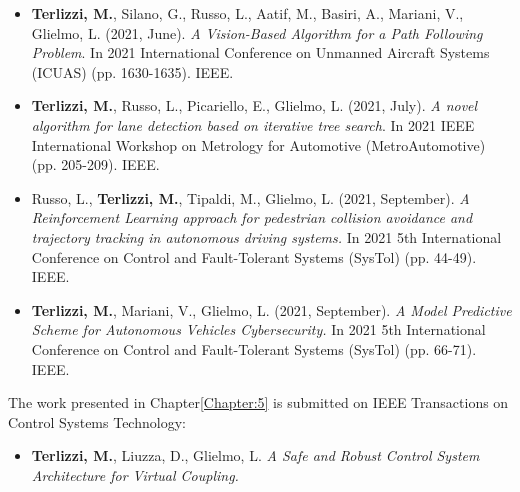 \begin{itemize}
	\item \cite{terlizzi2021vision} \textbf{Terlizzi, M.}, Silano, G., Russo, L., Aatif, M., Basiri, A., Mariani, V.,  Glielmo, L. (2021, June). \textit{A Vision-Based Algorithm for a Path Following Problem}. In 2021 International Conference on Unmanned Aircraft Systems (ICUAS) (pp. 1630-1635). IEEE.
	\item \cite{terlizzi2021novel} \textbf{Terlizzi, M.}, Russo, L., Picariello, E.,  Glielmo, L. (2021, July).\textit{ A novel algorithm for lane detection based on iterative tree search}. In 2021 IEEE International Workshop on Metrology for Automotive (MetroAutomotive) (pp. 205-209). IEEE.
	\item \cite{russo2021reinforcement} Russo, L., \textbf{Terlizzi, M.}, Tipaldi, M.,  Glielmo, L. (2021, September). \textit{A Reinforcement Learning approach for pedestrian collision avoidance and trajectory tracking in autonomous driving systems.} In 2021 5th International Conference on Control and Fault-Tolerant Systems (SysTol) (pp. 44-49). IEEE.
	\item \cite{terlizzi2021CyberSecurity} \textbf{Terlizzi, M.}, Mariani, V.,  Glielmo, L. (2021, September). \textit{A Model Predictive Scheme for Autonomous Vehicles Cybersecurity.} In 2021 5th International Conference on Control and Fault-Tolerant Systems (SysTol) (pp. 66-71). IEEE.
\end{itemize}
The work presented in Chapter\tildeAdd\ref{Chapter:5} is submitted on IEEE Transactions on Control Systems Technology:
\begin{itemize}
	\item \textbf{Terlizzi, M.}, Liuzza, D.,  Glielmo, L. \textit{A Safe and Robust Control System Architecture for Virtual Coupling.}
\end{itemize}





